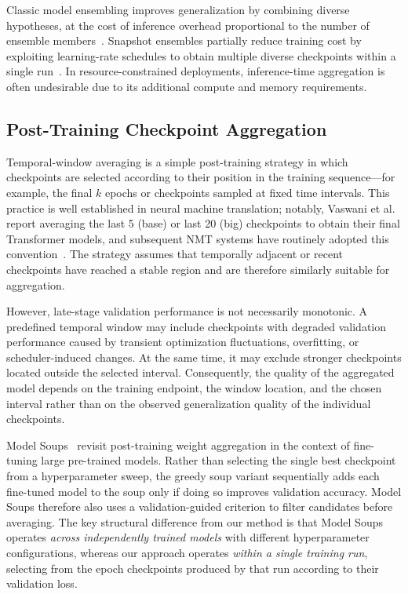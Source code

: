 \documentclass[runningheads]{llncs}
\begin{document}
Classic model ensembling improves generalization by combining diverse
hypotheses, at the cost of inference overhead proportional to the number
of ensemble members~\cite{dietterich2000ensemble}.
Snapshot ensembles partially reduce training cost by exploiting
learning-rate schedules to obtain multiple diverse checkpoints within a
single run~\cite{huang2017snapshotensemblestrain1}.
In resource-constrained deployments, inference-time aggregation is often
undesirable due to its additional compute and memory requirements.

\subsection{Post-Training Checkpoint Aggregation}

Temporal-window averaging is a simple post-training strategy in which
checkpoints are selected according to their position in the training
sequence---for example, the final $k$ epochs or checkpoints sampled at
fixed time intervals.
This practice is well established in neural machine translation; notably,
Vaswani et al.~\cite{vaswani2017attention} report averaging the last 5
(base) or last 20 (big) checkpoints to obtain their final Transformer
models, and subsequent NMT systems have routinely adopted this
convention~\cite{junczys2016neural}.
The strategy assumes that temporally adjacent or recent checkpoints have
reached a stable region and are therefore similarly suitable for
aggregation.

However, late-stage validation performance is not necessarily monotonic.
A predefined temporal window may include checkpoints with degraded
validation performance caused by transient optimization fluctuations,
overfitting, or scheduler-induced changes.
At the same time, it may exclude stronger checkpoints located outside the
selected interval.
Consequently, the quality of the aggregated model depends on the training
endpoint, the window location, and the chosen interval rather than on the
observed generalization quality of the individual checkpoints.

Model Soups~\cite{wortsman2022model} revisit post-training weight
aggregation in the context of fine-tuning large pre-trained models.
Rather than selecting the single best checkpoint from a hyperparameter
sweep, the greedy soup variant sequentially adds each fine-tuned model to
the soup only if doing so improves validation accuracy.
Model Soups therefore also uses a validation-guided criterion to filter
candidates before averaging.
The key structural difference from our method is that Model Soups
operates \emph{across independently trained models} with different
hyperparameter configurations, whereas our approach operates
\emph{within a single training run}, selecting from the epoch checkpoints
produced by that run according to their validation loss.
\end{document}
